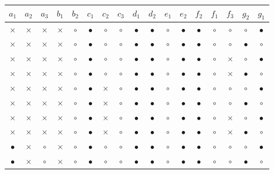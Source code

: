\begin{BehExample}
\begin{table}
{\setlength\tabcolsep{3.25pt}
\noindent
\begin{tabular}{|c|c|c|c|c|c|c|c|c|c|c|c|c|c|c|c|c|}
  \hline
 $a_1$ & $a_2$ & $a_3$ & $b_1$ & $b_2$ & $c_1$ & $c_2$ & $c_3$ & $d_1$ & $d_2$ & $e_1$ & $e_2$ & $f_2$ & $f_1$ & $f_3$ & $g_2$ & $g_1$ \\ 
\hline
$\times$ & $\times$ & $\times$ & $\times$ & $\circ$ & $\bullet$ & $\circ$ & $\circ$ & $\bullet$ & $\bullet$ & $\circ$ & $\bullet$ & $\bullet$ & $\circ$ & $\circ$ & $\circ$ & $\bullet$ \\ 
\hline
$\times$ & $\times$ & $\times$ & $\times$ & $\circ$ & $\bullet$ & $\circ$ & $\circ$ & $\bullet$ & $\bullet$ & $\circ$ & $\bullet$ & $\bullet$ & $\circ$ & $\circ$ & $\bullet$ & $\circ$ \\ 
\hline
$\times$ & $\times$ & $\times$ & $\times$ & $\circ$ & $\bullet$ & $\circ$ & $\circ$ & $\bullet$ & $\bullet$ & $\circ$ & $\bullet$ & $\bullet$ & $\circ$ & $\times$ & $\circ$ & $\bullet$ \\ 
\hline
$\times$ & $\times$ & $\times$ & $\times$ & $\circ$ & $\bullet$ & $\circ$ & $\circ$ & $\bullet$ & $\bullet$ & $\circ$ & $\bullet$ & $\bullet$ & $\circ$ & $\times$ & $\bullet$ & $\circ$ \\ 
\hline
$\times$ & $\times$ & $\times$ & $\times$ & $\circ$ & $\bullet$ & $\times$ & $\circ$ & $\bullet$ & $\bullet$ & $\circ$ & $\bullet$ & $\bullet$ & $\circ$ & $\circ$ & $\circ$ & $\bullet$ \\ 
\hline
$\times$ & $\times$ & $\times$ & $\times$ & $\circ$ & $\bullet$ & $\times$ & $\circ$ & $\bullet$ & $\bullet$ & $\circ$ & $\bullet$ & $\bullet$ & $\circ$ & $\circ$ & $\bullet$ & $\circ$ \\ 
\hline
$\times$ & $\times$ & $\times$ & $\times$ & $\circ$ & $\bullet$ & $\times$ & $\circ$ & $\bullet$ & $\bullet$ & $\circ$ & $\bullet$ & $\bullet$ & $\circ$ & $\times$ & $\circ$ & $\bullet$ \\ 
\hline
$\times$ & $\times$ & $\times$ & $\times$ & $\circ$ & $\bullet$ & $\times$ & $\circ$ & $\bullet$ & $\bullet$ & $\circ$ & $\bullet$ & $\bullet$ & $\circ$ & $\times$ & $\bullet$ & $\circ$ \\ 
\hline
$\bullet$ & $\times$ & $\circ$ & $\times$ & $\circ$ & $\bullet$ & $\circ$ & $\circ$ & $\bullet$ & $\bullet$ & $\circ$ & $\bullet$ & $\bullet$ & $\circ$ & $\circ$ & $\circ$ & $\bullet$ \\ 
\hline
$\bullet$ & $\times$ & $\circ$ & $\times$ & $\circ$ & $\bullet$ & $\circ$ & $\circ$ & $\bullet$ & $\bullet$ & $\circ$ & $\bullet$ & $\bullet$ & $\circ$ & $\circ$ & $\bullet$ & $\circ$ \\ 

\end{tabular}}
\end{table}
\end{BehExample}
